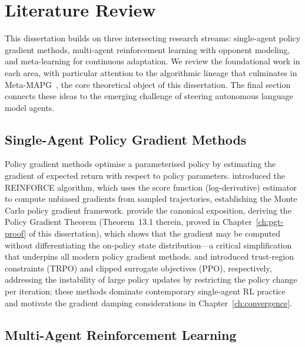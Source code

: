 
\chapter{Literature Review}
\label{ch:literature-review}

This dissertation builds on three intersecting research streams: single-agent policy gradient methods, multi-agent reinforcement learning with opponent modeling, and meta-learning for continuous adaptation. We review the foundational work in each area, with particular attention to the algorithmic lineage that culminates in Meta-MAPG~\cite{kim2021policygradientalgorithmlearning}, the core theoretical object of this dissertation. The final section connects these ideas to the emerging challenge of steering autonomous language model agents.

\section{Single-Agent Policy Gradient Methods}
\label{sec:lit-single-agent}

Policy gradient methods optimise a parameterised policy by estimating the gradient of expected return with respect to policy parameters. \citet{williams1992} introduced the REINFORCE algorithm, which uses the score function (log-derivative) estimator to compute unbiased gradients from sampled trajectories, establishing the Monte Carlo policy gradient framework. \citet{sutton2018rl} provide the canonical exposition, deriving the Policy Gradient Theorem (Theorem~13.1 therein, proved in Chapter~\ref{ch:pgt-proof} of this dissertation), which shows that the gradient may be computed without differentiating the on-policy state distribution---a critical simplification that underpins all modern policy gradient methods. \citet{schulman2015trpo} and \citet{schulman2017ppo} introduced trust-region constraints (TRPO) and clipped surrogate objectives (PPO), respectively, addressing the instability of large policy updates by restricting the policy change per iteration; these methods dominate contemporary single-agent RL practice and motivate the gradient damping considerations in Chapter~\ref{ch:convergence}.

\section{Multi-Agent Reinforcement Learning}
\label{sec:lit-marl}

